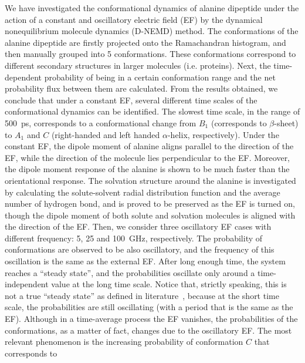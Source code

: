 \documentclass[a4paper,preprint,unsortedaddress,onecolumn]{revtex4-1}
\begin{document}
We have investigated the conformational
dynamics of alanine dipeptide under the action of a constant and oscillatory electric
field (EF) by the dynamical nonequilibrium molecule dynamics (D-NEMD) method.
The conformations of the alanine dipeptide are
firstly projected onto the Ramachandran histogram, and
then manually grouped into 5  conformations.
These conformations
correspond to different secondary structures in larger molecules (i.e. proteins).
Next, the time-dependent probability
of being in a certain conformation range and the net probability flux
between them are calculated. 
From the results obtained, we conclude that under a constant EF, several different time scales
of the conformational dynamics can be identified. The slowest time scale,
in the range of 500~ps, corresponds to a conformational change
from $B_1$ (corresponds to $\beta$-sheet) to $A_1$ and $C$ (right-handed
and left handed $\alpha$-helix, respectively).
Under the constant EF, the dipole moment of alanine aligns parallel to the direction of the EF, while the direction of the molecule lies perpendicular to the
EF. Moreover, the dipole moment response of the alanine is
shown to be much faster than the orientational response.
The solvation structure around the alanine is investigated
by calculating the solute-solvent radial distribution function and the average number of hydrogen
bond, and is proved to be preserved as the EF is turned on, though the
dipole moment of both solute and solvation molecules is aligned with the direction of the EF.
Then, we consider three oscillatory EF cases with different frequency:
5, 25 and 100~GHz, respectively. The
probability of conformations are observed to be also oscillatory,
and the frequency of this oscillation is the same as the external EF.
After long enough time,
the system reaches a ``steady state'', and the probabilities oscillate only around
a time-independent value at the long time scale. Notice that, strictly speaking, this is not a  true ``steady state'' as defined in
literature~\cite{seifert2010fluctuation}, because at the
short time scale, the probabilities are still oscillating (with a period that is the same as the EF).
Although in a time-average process the EF vanishes, the probabilities of the conformations, as a matter of fact, changes due to the oscillatory EF. The most relevant phenomenon
is the increasing probability of conformation $C$ that corresponds to
\end{document}
